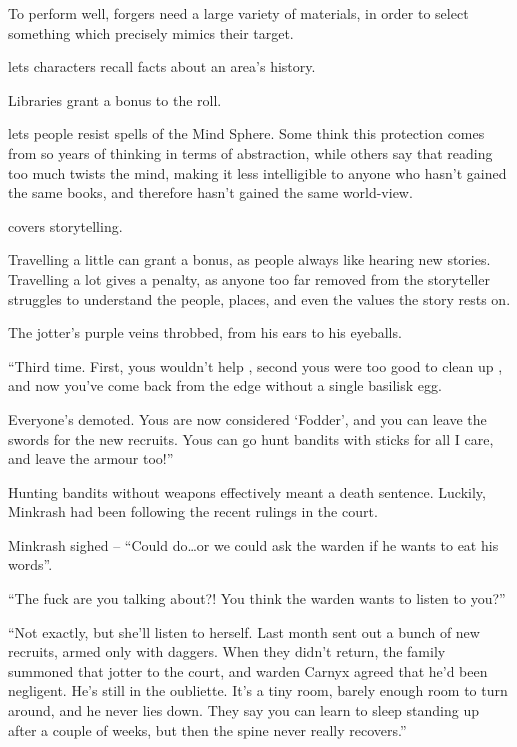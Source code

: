 \begin{multicols}{2}
\begin{description}
    To perform well, forgers need a large variety of materials, in order to select something which precisely mimics their target.
  \item[\roll{Intelligence}{Academics}]
    lets characters recall facts about an area's history.

    Libraries grant a bonus to the roll.
  \item[\roll{Wits}{Academics}]
    lets people resist spells of the Mind Sphere.
    Some think this protection comes from so years of thinking in terms of abstraction, while others say that reading too much twists the mind, making it less intelligible to anyone who hasn't gained the same books, and therefore hasn't gained the same world-view.
  \item[\roll{Charisma}{Academics}]
    covers storytelling.

    Travelling a little can grant a bonus, as people always like hearing new stories.
    Travelling a lot gives a penalty, as anyone too far removed from the storyteller struggles to understand the people, places, and even the values the story rests on.
\end{description}

\begin{exampletext}
  The \gls{jotter}'s purple veins throbbed, from his ears to his eyeballs.

  ``Third time.
  First, yous wouldn't help , second yous were too good to clean up , and now you've come back from the \gls{edge} without a single \gls{basilisk} egg.

  Everyone's demoted.
  Yous are now considered `Fodder', and you can leave the swords for the new recruits.
  Yous can go hunt bandits with sticks for all I care, and leave the armour too!''

  Hunting bandits without weapons effectively meant a death sentence.
  Luckily, Minkrash had been following the recent rulings in the \gls{court}.

  Minkrash sighed -- ``Could do\ldots or we could ask the \gls{warden} if he wants to eat his words''.

  ``The fuck are you talking about?!
  You think the \gls{warden} wants to listen to you?''

  ``Not exactly, but she'll listen to herself.
  Last month  sent out a bunch of new recruits, armed only with daggers.
  When they didn't return, the family summoned that \gls{jotter} to the \gls{court}, and \gls{warden} Carnyx agreed that he'd been negligent.
  He's still in the oubliette.
  It's a tiny room, barely enough room to turn around, and he never lies down.
  They say you can learn to sleep standing up after a couple of weeks, but then the spine never really recovers.''


\end{exampletext}
\end{multicols}
